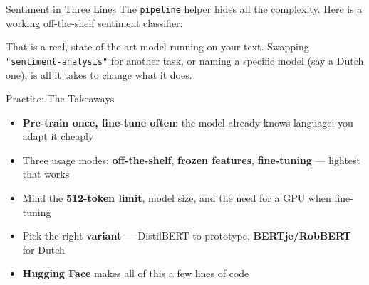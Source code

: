 \documentclass[aspectratio=169]{beamer}
\begin{document}
\begin{frame}{Sentiment in Three Lines}
\vspace{0.3cm}
{\small The \texttt{pipeline} helper hides all the complexity. Here is a working
off-the-shelf sentiment classifier:}

\medskip
\begin{center}
\end{center}

\medskip
{\small That is a real, state-of-the-art model running on your text. Swapping
\texttt{"sentiment-analysis"} for another task, or naming a specific model (say a Dutch one),
is all it takes to change what it does.}
\end{frame}

\begin{frame}{Practice: The Takeaways}
\vspace{0.25cm}
\begin{itemize}\setlength\itemsep{7pt}
  \item[\textcolor{wurgreen}{\faCheck}]
    \textbf{Pre-train once, fine-tune often}: the model already knows language; you adapt it cheaply
  \item[\textcolor{wurgreen}{\faCheck}]
    Three usage modes: \textbf{off-the-shelf}, \textbf{frozen features}, \textbf{fine-tuning} ---
    lightest that works
  \item[\textcolor{wurgreen}{\faCheck}]
    Mind the \textbf{512-token limit}, model size, and the need for a GPU when fine-tuning
  \item[\textcolor{wurgreen}{\faCheck}]
    Pick the right \textbf{variant} --- DistilBERT to prototype, \textbf{BERTje/RobBERT} for Dutch
  \item[\textcolor{wurgreen}{\faCheck}]
    \textbf{Hugging Face} makes all of this a few lines of code
\end{itemize}

\medskip
{}
\end{frame}
\end{document}
